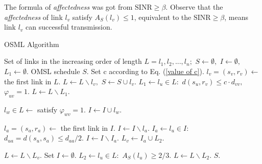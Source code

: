 \documentclass[conference]{IEEEtran}
\begin{document}
The formula of \emph{affectedness} was got from $\textrm{SINR} \geq \beta$. Observe that the \emph{affectedness} of link $l_v$ satisfy $A_S(l_v)\leq 1$, equivalent to the $\textrm{SINR} \geq \beta$, means link $l_v$ can successful transmission.

\begin{algorithm}
\caption{OSML Algorithm}
\label{alg1}
\begin{algorithmic}[1]
\REQUIRE Set of links in the increasing order of length $L={l_1,l_2,...,l_n};$ $S \leftarrow \emptyset,$ $I \leftarrow \emptyset,$ $L_1 \leftarrow \emptyset$.
\ENSURE OMSL schedule $S$.
\STATE Set c according to Eq. (\ref{value of c}).
\REPEAT
\STATE $l_v=(s_v,r_v) \leftarrow$ the first link in $L$.
\STATE $L \leftarrow L \backslash {l_v},$ $S \leftarrow S\cup {l_v}$.
\STATE $L_1 \leftarrow l_u \in L:$ $d(s_u,r_v) \leq c \cdot d_{vv},$ $\varphi_{uv}=1$.
\STATE $L \leftarrow L \backslash L_1$.

\REPEAT
\STATE $l_w \in L \leftarrow$ satisfy $\varphi_{wv}=1$.
\STATE $I \leftarrow I \cup {l_w}$.

\REPEAT
\STATE $l_a=(s_a,r_a) \leftarrow$ the first link in $I$.
\STATE $I \leftarrow I \backslash l_a$.
\REPEAT
\STATE $I_a \leftarrow l_u \in I:$ $d_{ua}=d(s_u,s_a) \leq  d_{aa}/2$.
\STATE $I \leftarrow I \backslash I_a$.
\STATE $L_v \leftarrow I_a \cup L_2$.

\STATE $L \leftarrow L \backslash L_v$.
\STATE Set $I \leftarrow \emptyset$.
\STATE $L_2 \leftarrow l_u \in L:$ $A_S(l_u) \geq 2/3$.
\STATE $L \leftarrow L \backslash L_2$.
\RETURN $S$.
\end{algorithmic}
\end{algorithm}
\end{document}

